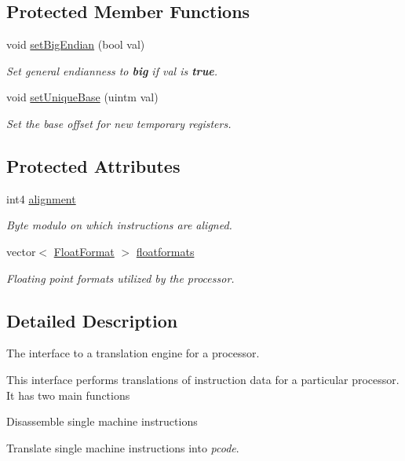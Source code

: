 \subsection*{Protected Member Functions}
\begin{DoxyCompactItemize}
\item 
void \mbox{\hyperlink{class_translate_a9a2ad5552b84744edd239c3854c8302a}{set\+Big\+Endian}} (bool val)
\begin{DoxyCompactList}\small\item\em Set general endianness to {\bfseries{big}} if val is {\bfseries{true}}. \end{DoxyCompactList}\item 
void \mbox{\hyperlink{class_translate_a57dd5230f05fca5b38e7768472c5b5ee}{set\+Unique\+Base}} (uintm val)
\begin{DoxyCompactList}\small\item\em Set the base offset for new temporary registers. \end{DoxyCompactList}\end{DoxyCompactItemize}
\subsection*{Protected Attributes}
\begin{DoxyCompactItemize}
\item 
int4 \mbox{\hyperlink{class_translate_a75455c0e7fa98d8cd490d7c113f099e9}{alignment}}
\begin{DoxyCompactList}\small\item\em Byte modulo on which instructions are aligned. \end{DoxyCompactList}\item 
vector$<$ \mbox{\hyperlink{class_float_format}{Float\+Format}} $>$ \mbox{\hyperlink{class_translate_af609b454fe5a71cd72d9eaf525299fb5}{floatformats}}
\begin{DoxyCompactList}\small\item\em Floating point formats utilized by the processor. \end{DoxyCompactList}\end{DoxyCompactItemize}


\subsection{Detailed Description}
The interface to a translation engine for a processor. 

This interface performs translations of instruction data for a particular processor. It has two main functions
\begin{DoxyItemize}
\item Disassemble single machine instructions
\item Translate single machine instructions into {\itshape pcode}.
\end{DoxyItemize}

